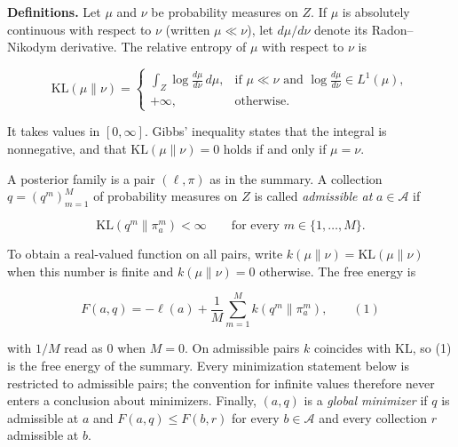 \documentclass[11pt,a4paper]{report}
\begin{document}
\textbf{Definitions.} Let \(\mu\) and \(\nu\) be probability measures on \(Z\). If \(\mu\) is absolutely continuous with respect to \(\nu\) (written \(\mu\ll\nu\)), let \(d\mu/d\nu\) denote its Radon–Nikodym derivative. The relative entropy of \(\mu\) with respect to \(\nu\) is


\[\mathrm{KL}(\mu\|\nu)=\begin{cases}\displaystyle\int_Z\log\frac{d\mu}{d\nu}\,d\mu, & \text{if }\mu\ll\nu\text{ and }\log\frac{d\mu}{d\nu}\in L^1(\mu),\\ +\infty, & \text{otherwise}.\end{cases}\]


It takes values in \([0,\infty]\). Gibbs' inequality states that the integral is nonnegative, and that \(\mathrm{KL}(\mu\|\nu)=0\) holds if and only if \(\mu=\nu\).




A posterior family is a pair \((\ell,\pi)\) as in the summary. A collection \(q=(q^m)_{m=1}^M\) of probability measures on \(Z\) is called \emph{admissible at} \(a\in\mathcal A\) if


\[\mathrm{KL}(q^m\|\pi_a^m)<\infty\qquad\text{for every }m\in\{1,\dots,M\}.\]


To obtain a real-valued function on all pairs, write \(k(\mu\|\nu)=\mathrm{KL}(\mu\|\nu)\) when this number is finite and \(k(\mu\|\nu)=0\) otherwise. The free energy is


\[F(a,q)=-\ell(a)+\frac1M\sum_{m=1}^Mk(q^m\|\pi_a^m),\qquad(1)\]


with \(1/M\) read as \(0\) when \(M=0\). On admissible pairs \(k\) coincides with \(\mathrm{KL}\), so (1) is the free energy of the summary. Every minimization statement below is restricted to admissible pairs; the convention for infinite values therefore never enters a conclusion about minimizers. Finally, \((a,q)\) is a \emph{global minimizer} if \(q\) is admissible at \(a\) and \(F(a,q)\le F(b,r)\) for every \(b\in\mathcal A\) and every collection \(r\) admissible at \(b\).
\end{document}

